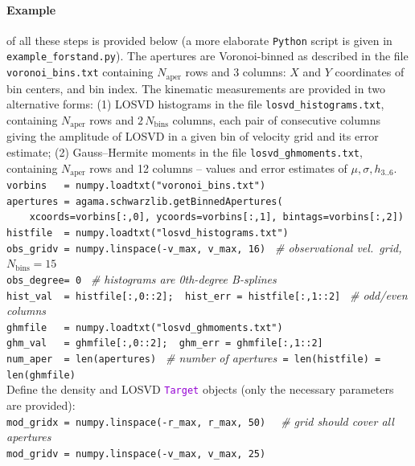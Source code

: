 \documentclass[12pt]{article}
\newcommand{\Python}{\texttt{Python}\xspace}
\newcommand{\ttt}[1]{\textcolor{darkviolet}{\texttt{#1}}}
\begin{document}
\paragraph{Example} \label{sec:SchwarzschildExample} of all these steps is provided below (a more elaborate \Python script is given in \texttt{example_forstand.py}). The apertures are Voronoi-binned as described in the file \texttt{voronoi_bins.txt} containing $N_\mathrm{aper}$ rows and 3 columns: $X$ and $Y$ coordinates of bin centers, and bin index. The kinematic measurements are provided in two alternative forms: (1) LOSVD histograms in the file \texttt{losvd_histograms.txt}, containing $N_\mathrm{aper}$ rows and $2\,N_\mathrm{bins}$ columns, each pair of consecutive columns giving the amplitude of LOSVD in a given bin of velocity grid and its error estimate; (2) Gauss--Hermite moments in the file \texttt{losvd_ghmoments.txt}, containing $N_\mathrm{aper}$ rows and 12 columns -- values and error estimates of $\mu, \sigma, h_{3..6}$.\\[2mm]
\texttt{vorbins~~~= numpy.loadtxt("voronoi_bins.txt")\\
apertures~= agama.schwarzlib.getBinnedApertures(\\
\mbox{}~~~~xcoords=vorbins[:,0], ycoords=vorbins[:,1], bintags=vorbins[:,2])\\
histfile~~= numpy.loadtxt("losvd_histograms.txt")\\
obs_gridv~= numpy.linspace(-v_max, v_max, 16)}
\textit{\color{Sepia} \ \# observational vel.~grid, $N_\mathrm{bins}=15$}\\
\texttt{obs_degree= 0}
\textit{\color{Sepia} \ \# histograms are 0th-degree B-splines}\\
\texttt{hist_val~~= histfile[:,0::2];~~hist_err = histfile[:,1::2]}
\textit{\color{Sepia} \ \# odd/even columns}\\
\texttt{ghmfile~~~= numpy.loadtxt("losvd_ghmoments.txt")\\
ghm_val~~~= ghmfile[:,0::2];~~ghm_err = ghmfile[:,1::2]\\
num_aper~~= len(apertures)} 
{\color{Sepia}\textit{\ \# number of apertures}\texttt{ = len(histfile) = len(ghmfile)}}\\[2mm]
Define the density and LOSVD \ttt{Target} objects (only the necessary parameters are provided):\\[2mm]
\texttt{mod_gridx~= numpy.linspace(-r_max, r_max, 50)}
\textit{\color{Sepia} \ \ \# grid should cover all apertures}\\
\texttt{mod_gridv~= numpy.linspace(-v_max, v_max, 25)}
\end{document}
